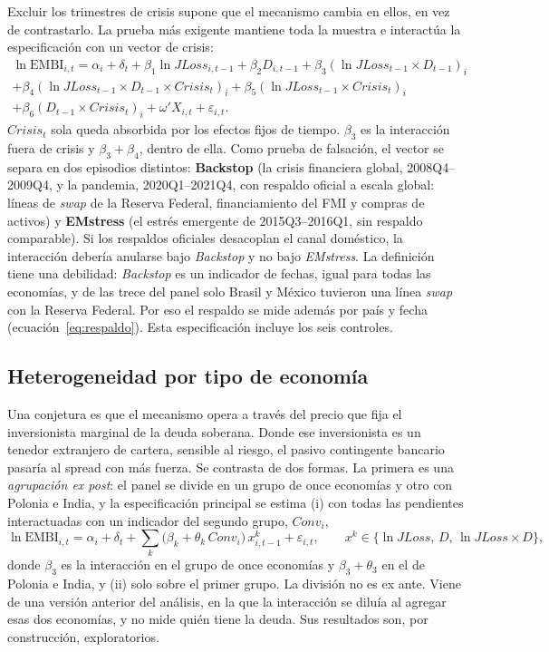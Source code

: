Excluir los trimestres de crisis supone que el mecanismo cambia en ellos, en vez de contrastarlo. La prueba más exigente mantiene toda la muestra e interactúa la especificación con un vector de crisis:
\begin{multline}
\ln\mathrm{EMBI}_{i,t}=\alpha_i+\delta_t+\beta_1\ln JLoss_{i,t-1}+\beta_2D_{i,t-1}+\beta_3(\ln JLoss_{t-1}\times D_{t-1})_i\\
+\beta_4(\ln JLoss_{t-1}\times D_{t-1}\times Crisis_t)_i+\beta_5(\ln JLoss_{t-1}\times Crisis_t)_i\\
+\beta_6(D_{t-1}\times Crisis_t)_i+\omega'X_{i,t}+\varepsilon_{i,t}.
\label{eq:crisisint}
\end{multline}
$Crisis_t$ sola queda absorbida por los efectos fijos de tiempo. $\beta_3$ es la interacción fuera de crisis y $\beta_3+\beta_4$, dentro de ella. Como prueba de falsación, el vector se separa en dos episodios distintos: \textbf{Backstop} (la crisis financiera global, 2008Q4--2009Q4, y la pandemia, 2020Q1--2021Q4, con respaldo oficial a escala global: líneas de \textit{swap} de la Reserva Federal, financiamiento del FMI y compras de activos) y \textbf{EMstress} (el estrés emergente de 2015Q3--2016Q1, sin respaldo comparable). Si los respaldos oficiales desacoplan el canal doméstico, la interacción debería anularse bajo \textit{Backstop} y no bajo \textit{EMstress}. La definición tiene una debilidad: \textit{Backstop} es un indicador de fechas, igual para todas las economías, y de las trece del panel solo Brasil y México tuvieron una línea \textit{swap} con la Reserva Federal. Por eso el respaldo se mide además por país y fecha (ecuación~\eqref{eq:respaldo}). Esta especificación incluye los seis controles.

\subsection{Heterogeneidad por tipo de economía}
\label{sec:est-het}

Una conjetura es que el mecanismo opera a través del precio que fija el inversionista marginal de la deuda soberana. Donde ese inversionista es un tenedor extranjero de cartera, sensible al riesgo, el pasivo contingente bancario pasaría al spread con más fuerza. Se contrasta de dos formas. La primera es una \emph{agrupación ex post}: el panel se divide en un grupo de once economías y otro con Polonia e India, y la especificación principal se estima (i) con todas las pendientes interactuadas con un indicador del segundo grupo, $Conv_i$,
\begin{equation}
\ln\mathrm{EMBI}_{i,t}=\alpha_i+\delta_t+\sum_{k}\bigl(\beta_k+\theta_k\,Conv_i\bigr)\,x^{k}_{i,t-1}+\varepsilon_{i,t},\qquad x^{k}\in\{\ln JLoss,\,D,\,\ln JLoss\times D\},
\label{eq:heterogeneidad}
\end{equation}
donde $\beta_3$ es la interacción en el grupo de once economías y $\beta_3+\theta_3$ en el de Polonia e India, y (ii) solo sobre el primer grupo. La división no es ex ante. Viene de una versión anterior del análisis, en la que la interacción se diluía al agregar esas dos economías, y no mide quién tiene la deuda. Sus resultados son, por construcción, exploratorios.

